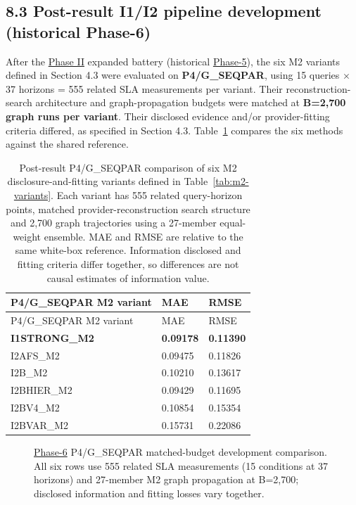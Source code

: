 \documentclass[10pt,a4paper]{article}
\begin{document}
\subsection*{8.3 Post-result I1/I2 pipeline development (historical Phase-6)}

After the \hyperref[app:experiment-stages]{Phase II} expanded battery (historical \hyperref[app:experiment-stages]{Phase-5}), the six M2 variants defined in Section 4.3 were evaluated on \textbf{P4/G\_SEQPAR}, using 15 queries \ensuremath{\times} 37 horizons = 555 related SLA measurements per variant. Their reconstruction-search architecture and graph-propagation budgets were matched at \textbf{B=2,700 graph runs per variant}. Their disclosed evidence and/or provider-fitting criteria differed, as specified in Section 4.3. Table~\ref{tab:phase6-m2-errors} compares the six methods against the shared reference.

\begingroup
\footnotesize
\setlength{\tabcolsep}{3pt}
\begin{longtable}{@{}p{}p{}p{}@{}}
\caption{Post-result P4/G\_SEQPAR comparison of six M2 disclosure-and-fitting variants defined in Table~\ref{tab:m2-variants}. Each variant has 555 related query-horizon points, matched provider-reconstruction search structure and 2,700 graph trajectories using a 27-member equal-weight ensemble. MAE and RMSE are relative to the same white-box reference. Information disclosed and fitting criteria differ together, so differences are not causal estimates of information value.}\label{tab:phase6-m2-errors}\\
\toprule
P4/G\_SEQPAR M2 variant & MAE & RMSE \\
\midrule
\endfirsthead
\toprule
P4/G\_SEQPAR M2 variant & MAE & RMSE \\
\midrule
\endhead
\textbf{I1STRONG\_M2} & \textbf{0.09178} & \textbf{0.11390} \\
I2AFS\_M2 & 0.09475 & 0.11826 \\
I2B\_M2 & 0.10210 & 0.13617 \\
I2BHIER\_M2 & 0.09429 & 0.11695 \\
I2BV4\_M2 & 0.10854 & 0.15354 \\
I2BVAR\_M2 & 0.15731 & 0.22086 \\
\bottomrule
\end{longtable}
\endgroup

\begin{figure}[htbp]
\centering

\caption{\hyperref[app:experiment-stages]{Phase-6} P4/G\_SEQPAR matched-budget development comparison. All six rows use 555 related SLA measurements (15 conditions at 37 horizons) and 27-member M2 graph propagation at B=2,700; disclosed information and fitting losses vary together.}
\end{figure}
\end{document}
